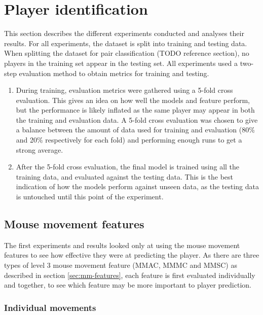 \documentclass[Report.tex]{subfiles}
\begin{document}
\section{Player identification}
This section describes the different experiments conducted and analyses their results. For all experiments, the dataset is split into training and testing data. When splitting the dataset for pair classification (TODO reference section), no players in the training set appear in the testing set. All experiments used a two-step evaluation method to obtain metrics for training and testing.
\begin{enumerate}
\item During training, evaluation metrics were gathered using a 5-fold cross evaluation. This gives an idea on how well the models and feature perform, but the performance is likely inflated as the same player may appear in both the training and evaluation data. A 5-fold cross evaluation was chosen to give a balance between the amount of data used for training and evaluation (80\% and 20\% respectively for each fold) and performing enough runs to get a strong average. 
\item After the 5-fold cross evaluation, the final model is trained using all the training data, and evaluated against the testing data. This is the best indication of how the models perform against unseen data, as the testing data is untouched until this point of the experiment. 
\end{enumerate}

\subsection{Mouse movement features}\label{sec:mm-features-results}
The first experiments and results looked only at using the mouse movement features to see how effective they were at predicting the player. As there are three types of level 3 mouse movement feature (MMAC, MMMC and MMSC) as described in section \ref{sec:mm-features}, each feature is first evaluated individually and together, to see which feature may be more important to player prediction. 

\subsubsection{Individual movements}
 
\end{document}
